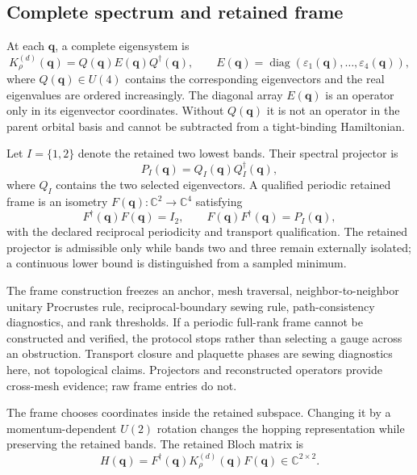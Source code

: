\documentclass[11pt]{article}
\newcommand{\C}{\mathbb C}
\begin{document}
\subsection{Complete spectrum and retained frame}

At each $\mathbf q$, a complete eigensystem is
\begin{equation}
 K_\rho^{(d)}(\mathbf q)
 =Q(\mathbf q)E(\mathbf q)Q^\dagger(\mathbf q),
 \qquad
 E(\mathbf q)=\operatorname{diag}
 (\varepsilon_1(\mathbf q),\ldots,\varepsilon_4(\mathbf q)),
 \label{eq:eigensystem}
\end{equation}
where $Q(\mathbf q)\in U(4)$ contains the corresponding eigenvectors and the real
eigenvalues are ordered increasingly. The diagonal array $E(\mathbf q)$ is an operator
only in its eigenvector coordinates. Without $Q(\mathbf q)$ it is not an operator in the
parent orbital basis and cannot be subtracted from a tight-binding Hamiltonian.

Let $I=\{1,2\}$ denote the retained two lowest bands. Their spectral projector is
\begin{equation}
 P_I(\mathbf q)=Q_I(\mathbf q)Q_I^\dagger(\mathbf q),
 \label{eq:retained-projector}
\end{equation}
where $Q_I$ contains the two selected eigenvectors. A qualified periodic retained frame
is an isometry $F(\mathbf q):\C^2\to\C^4$ satisfying
\begin{equation}
 F^\dagger(\mathbf q)F(\mathbf q)=I_2,
 \qquad
 F(\mathbf q)F^\dagger(\mathbf q)=P_I(\mathbf q),
 \label{eq:frame-definition}
\end{equation}
with the declared reciprocal periodicity and transport qualification. The retained
projector is admissible only while bands two and three remain externally isolated; a
continuous lower bound is distinguished from a sampled minimum.

The frame construction freezes an anchor, mesh traversal, neighbor-to-neighbor unitary
Procrustes rule, reciprocal-boundary sewing rule, path-consistency diagnostics, and rank
thresholds. If a periodic full-rank frame cannot be constructed and verified, the
protocol stops rather than selecting a gauge across an obstruction. Transport closure
and plaquette phases are sewing diagnostics here, not topological claims. Projectors and
reconstructed operators provide cross-mesh evidence; raw frame entries do not.

The frame chooses coordinates inside the retained subspace. Changing it by a
momentum-dependent $U(2)$ rotation changes the hopping representation while preserving
the retained bands. The retained Bloch matrix is
\begin{equation}
 H(\mathbf q)=F^\dagger(\mathbf q)
 K_\rho^{(d)}(\mathbf q)F(\mathbf q)\in\C^{2\times2}.
 \label{eq:retained}
\end{equation}
\end{document}
